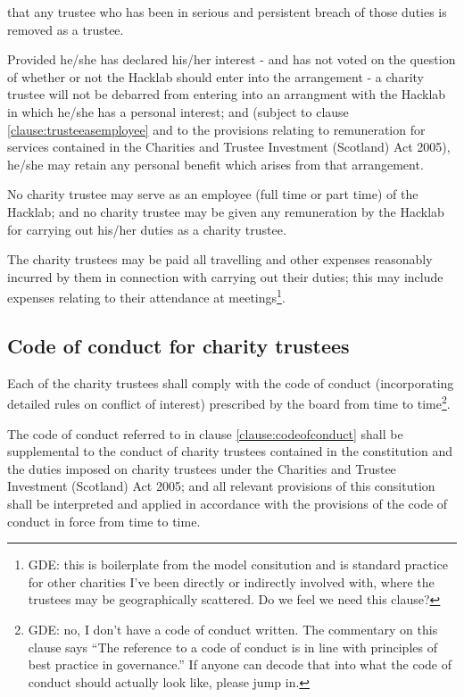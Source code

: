 \documentclass{article}
\newcommand{\charityact}{Charities and Trustee Investment (Scotland) Act 2005}
\begin{document}
\subclause that any trustee who has been in serious and persistent
breach of those duties is removed as a trustee.

\clause Provided he/she has declared his/her interest - and has not
voted on the question of whether or not the Hacklab should enter into
the arrangement - a charity trustee will not be debarred from entering
into an arrangment with the Hacklab in which he/she has a personal
interest; and (subject to clause \ref{clause:trusteeasemployee} and to
the provisions relating to remuneration for services contained in the
\charityact), he/she may
retain any personal benefit which arises from that arrangement.

\clause\label{clause:trusteeasemployee}No charity trustee may serve as
an employee (full time or part time) of the Hacklab; and no
charity trustee may be given any remuneration by the Hacklab for
carrying out his/her duties as a charity trustee.

\clause The charity trustees may be paid all travelling and other
expenses reasonably incurred by them in connection with carrying out
their duties; this may include expenses relating to their attendance
at meetings\footnote{GDE: this is boilerplate from the model
  consitution and is standard practice for other charities I've been
  directly or indirectly involved with, where the trustees may be
  geographically scattered. Do we feel we need this clause?}.

\subsection{Code of conduct for charity trustees}

\clause Each of the charity trustees shall comply with the code of
conduct (incorporating detailed rules on conflict of interest)
prescribed by the board from time to time\footnote{GDE: no, I don't
  have a code of conduct written. The commentary on this clause says
  ``The reference to a code of conduct is in line with principles of
  best practice in governance.'' If anyone can decode that into what
  the code of conduct should actually look like, please jump in.}.

\clause The code of conduct referred to in clause
\ref{clause:codeofconduct} shall be supplemental to the conduct of
charity trustees contained in the constitution and the duties imposed
on charity trustees under the \charityact; and all relevant provisions
of this consitution shall be interpreted and applied in accordance
with the provisions of the code of conduct in force from time to time.
\end{document}
